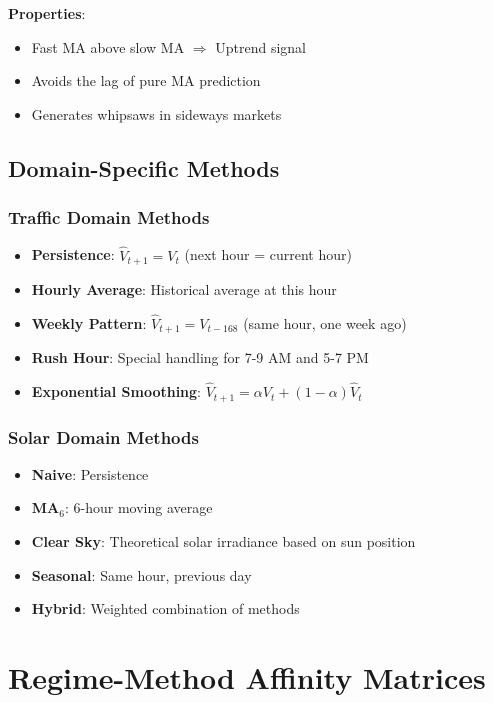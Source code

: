 \documentclass[11pt,a4paper]{article}
\theoremstyle{definition}
\theoremstyle{plain}
\begin{document}
\textbf{Properties}:
\begin{itemize}
    \item Fast MA above slow MA $\Rightarrow$ Uptrend signal
    \item Avoids the lag of pure MA prediction
    \item Generates whipsaws in sideways markets
\end{itemize}

\subsection{Domain-Specific Methods}

\subsubsection{Traffic Domain Methods}

\begin{itemize}
    \item \textbf{Persistence}: $\hat{V}_{t+1} = V_t$ (next hour = current hour)
    \item \textbf{Hourly Average}: Historical average at this hour
    \item \textbf{Weekly Pattern}: $\hat{V}_{t+1} = V_{t-168}$ (same hour, one week ago)
    \item \textbf{Rush Hour}: Special handling for 7-9 AM and 5-7 PM
    \item \textbf{Exponential Smoothing}: $\hat{V}_{t+1} = \alpha V_t + (1-\alpha)\hat{V}_t$
\end{itemize}

\subsubsection{Solar Domain Methods}

\begin{itemize}
    \item \textbf{Naive}: Persistence
    \item \textbf{MA$_6$}: 6-hour moving average
    \item \textbf{Clear Sky}: Theoretical solar irradiance based on sun position
    \item \textbf{Seasonal}: Same hour, previous day
    \item \textbf{Hybrid}: Weighted combination of methods
\end{itemize}

\newpage
\section{Regime-Method Affinity Matrices}
\end{document}

